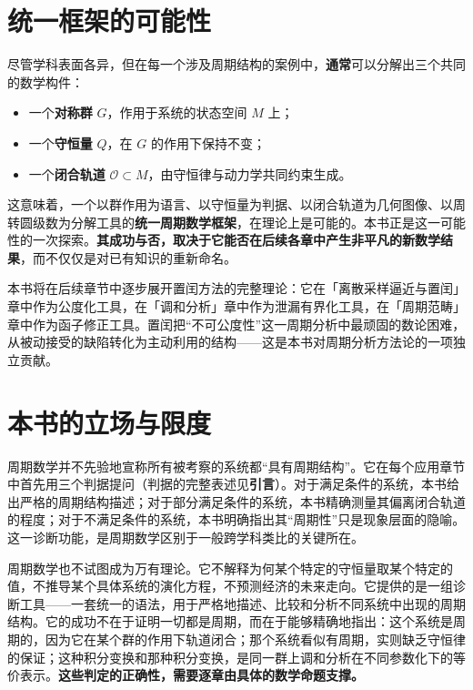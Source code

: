 \section*{统一框架的可能性}

尽管学科表面各异，但在每一个涉及周期结构的案例中，\textbf{通常}可以分解出三个共同的数学构件：

\begin{itemize}[leftmargin=2em]
    \item 一个\textbf{对称群} $G$，作用于系统的状态空间 $M$ 上；
    \item 一个\textbf{守恒量} $Q$，在 $G$ 的作用下保持不变；
    \item 一个\textbf{闭合轨道} $\mathcal{O} \subset M$，由守恒律与动力学共同约束生成。
\end{itemize}

这意味着，一个以群作用为语言、以守恒量为判据、以闭合轨道为几何图像、以周转圆级数为分解工具的\textbf{统一周期数学框架}，在理论上是可能的。本书正是这一可能性的一次探索。\textbf{其成功与否，取决于它能否在后续各章中产生非平凡的新数学结果}，而不仅仅是对已有知识的重新命名。

本书将在后续章节中逐步展开置闰方法的完整理论：它在「离散采样逼近与置闰」章中作为公度化工具，在「调和分析」章中作为泄漏有界化工具，在「周期范畴」章中作为函子修正工具。置闰把“不可公度性”这一周期分析中最顽固的数论困难，从被动接受的缺陷转化为主动利用的结构——这是本书对周期分析方法论的一项独立贡献。

\section*{本书的立场与限度}

周期数学并不先验地宣称所有被考察的系统都“具有周期结构”。它在每个应用章节中首先用三个判据提问（判据的完整表述见\textbf{引言}）。对于满足条件的系统，本书给出严格的周期结构描述；对于部分满足条件的系统，本书精确测量其偏离闭合轨道的程度；对于不满足条件的系统，本书明确指出其“周期性”只是现象层面的隐喻。这一诊断功能，是周期数学区别于一般跨学科类比的关键所在。

周期数学也不试图成为万有理论。它不解释为何某个特定的守恒量取某个特定的值，不推导某个具体系统的演化方程，不预测经济的未来走向。它提供的是一组诊断工具——一套统一的语法，用于严格地描述、比较和分析不同系统中出现的周期结构。它的成功不在于证明一切都是周期，而在于能够精确地指出：这个系统是周期的，因为它在某个群的作用下轨道闭合；那个系统看似有周期，实则缺乏守恒律的保证；这种积分变换和那种积分变换，是同一群上调和分析在不同参数化下的等价表示。\textbf{这些判定的正确性，需要逐章由具体的数学命题支撑。}

